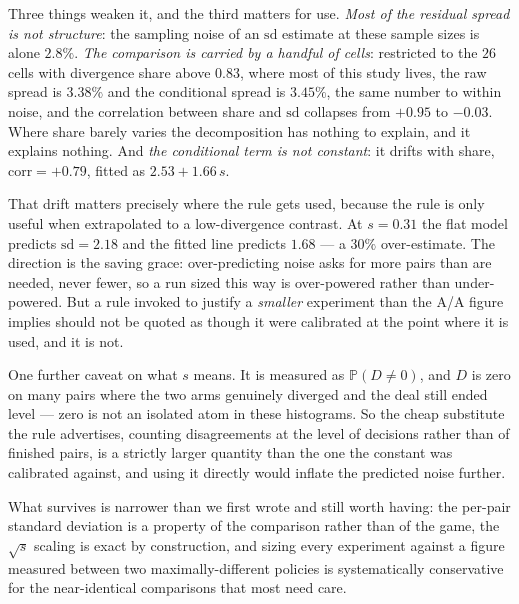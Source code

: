 \documentclass[11pt,letterpaper]{article}
\newcommand{\Prob}{\ensuremath{\mathbb{P}}}
\begin{document}
Three things weaken it, and the third matters for use. \emph{Most of the
residual spread is not structure}: the sampling noise of an $\mathrm{sd}$
estimate at these sample sizes is alone $2.8\%$. \emph{The comparison is carried
by a handful of cells}: restricted to the $26$ cells with divergence share above
$0.83$, where most of this study lives, the raw spread is $3.38\%$ and the
conditional spread is $3.45\%$, the same number to within noise, and the
correlation between share and $\mathrm{sd}$ collapses from $+0.95$ to $-0.03$.
Where share barely varies the decomposition has nothing to explain, and it
explains nothing. And \emph{the conditional term is not constant}: it drifts
with share, $\mathrm{corr} = +0.79$, fitted as $2.53 + 1.66\,s$.

That drift matters precisely where the rule gets used, because the rule is only
useful when extrapolated to a low-divergence contrast. At $s = 0.31$ the flat
model predicts $\mathrm{sd} = 2.18$ and the fitted line predicts $1.68$ --- a
$30\%$ over-estimate. The direction is the saving grace: over-predicting noise
asks for more pairs than are needed, never fewer, so a run sized this way is
over-powered rather than under-powered. But a rule invoked to justify a
\emph{smaller} experiment than the A/A figure implies should not be quoted as
though it were calibrated at the point where it is used, and it is not.

One further caveat on what $s$ means. It is measured as $\Prob(D \neq 0)$, and
$D$ is zero on many pairs where the two arms genuinely diverged and the deal
still ended level --- zero is not an isolated atom in these histograms. So the
cheap substitute the rule advertises, counting disagreements at the level of
decisions rather than of finished pairs, is a strictly larger quantity than the
one the constant was calibrated against, and using it directly would inflate the
predicted noise further.

What survives is narrower than we first wrote and still worth having: the
per-pair standard deviation is a property of the comparison rather than of the
game, the $\sqrt{s}$ scaling is exact by construction, and sizing every
experiment against a figure measured between two maximally-different policies is
systematically conservative for the near-identical comparisons that most need
care.

\label{sec:eval-sd}
\end{document}
